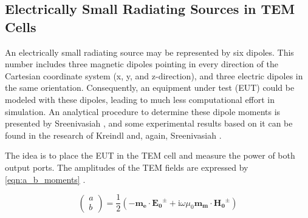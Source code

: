 \subsection{Electrically Small Radiating Sources in TEM Cells}


An electrically small radiating source may be represented by six dipoles. This number includes three magnetic dipoles pointing in every direction of the Cartesian coordinate system (x, y, and z-direction), and three electric dipoles in the same orientation. Consequently, an equipment under test (EUT) could be modeled with these dipoles, leading to much less computational effort in simulation. An analytical procedure to determine these dipole moments is presented by Sreenivasiah \cite{Sreenivasiah_Chang_Ma_1981}, and some experimental results based on it can be found in the research of Kreindl \cite{Kreindl_Bauernfeind_Weiss_Stockreiter_Kaltenbacher_2024} and, again, Sreenivasiah \cite{Sreenivasiah_Chang_Ma_1981}.


The idea is to place the EUT in the TEM cell and measure the power of both output ports. The amplitudes of the TEM fields are expressed by \autoref{eqn:a_b_moments} \cite{Sreenivasiah_Chang_Ma_1981}. %

\begin{equation}
    \begin{pmatrix}a \\b\end{pmatrix} = \frac{1}{2}(-\mathbf{m_e}\cdot \mathbf{E_0}^\pm+\mathrm{i}\omega\mu_0\mathbf{m_m}\cdot\mathbf{H_0}^\pm)
    \label{eqn:a_b_moments}
\end{equation}

